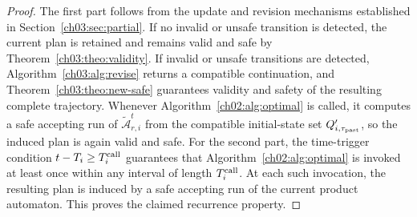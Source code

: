 \begin{proof}
The first part follows from the update and revision mechanisms established in
Section~\ref{ch03:sec:partial}. If no invalid or unsafe transition is detected,
the current plan is retained and remains valid and safe by
Theorem~\ref{ch03:theo:validity}. If invalid or unsafe transitions are
detected, Algorithm~\ref{ch03:alg:revise} returns a compatible continuation,
and Theorem~\ref{ch03:theo:new-safe} guarantees validity and safety of the
resulting complete trajectory. Whenever
Algorithm~\ref{ch02:alg:optimal} is called, it computes a safe accepting run of
$\tilde{\mathcal{A}}_{r,i}^t$ from the compatible initial-state set
$Q'_{i,\tau_{\textup{past}}}$, so the induced plan is again valid and safe.
For the second part, the time-trigger condition
$t - T_i \geq T_i^{\textup{call}}$ guarantees that
Algorithm~\ref{ch02:alg:optimal} is invoked at least once within any interval
of length $T_i^{\textup{call}}$. At each such invocation, the resulting plan is
induced by a safe accepting run of the current product automaton. This proves
the claimed recurrence property.
\end{proof}
